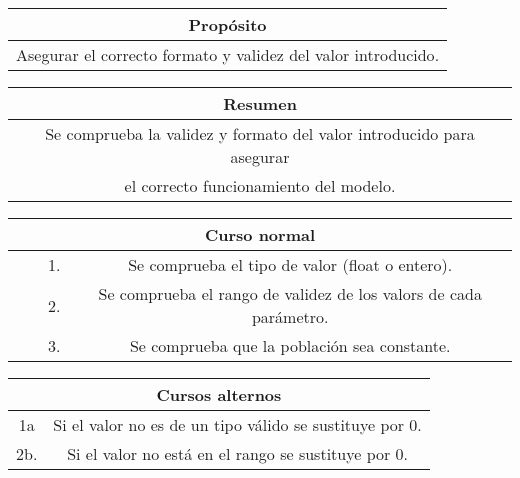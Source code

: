 \begin{table}[!h]
\begin{tabular}{|c|}
\hline
\cellcolor{cyan} \textbf{Propósito} \\
\hline
Asegurar el correcto formato y validez del valor introducido. \\
\hline
\end{tabular}
\end{table}

\begin{table}[!h]
\begin{tabular}{|c|}
\hline
\cellcolor{cyan} \textbf{Resumen}  \\
\hline
 Se comprueba la validez y formato del valor introducido para asegurar \\ el correcto funcionamiento del modelo.  \\
\hline
\end{tabular}
\end{table}

\begin{table}[!h]
\begin{tabular}{|c|c|c|c|}
\hline
\multicolumn{4}{|c|}{\cellcolor{cyan} \textbf{Curso normal}} \\
\hline
              &               &      1.        &    Se comprueba el tipo de valor (float o entero).         \\
\hline
              &               &      2.        &    Se  comprueba el rango de validez de los valors de cada parámetro.         \\
\hline
              &               &      3.        &    Se comprueba que la población sea constante.          \\
\hline
\end{tabular}
\end{table}

\begin{table}[!h]
\begin{tabular}{|c|c|}
\hline
\multicolumn{2}{|c|}{\cellcolor{cyan} \textbf{Cursos alternos}} \\
\hline
        1a       &     Si el valor no es de un tipo válido se sustituye por 0. \\
\hline
        2b.      &     Si el valor no está en el rango se sustituye por 0.         \\
\hline

\end{tabular}
\end{table}

